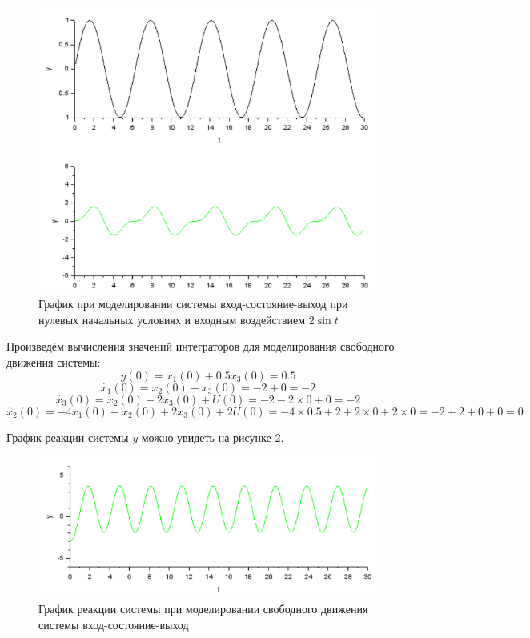 \documentclass[a4paper, 12pt]{article}
\begin{document}
\begin{figure}[h!]
	\centering
	\includegraphics[scale=0.7]{plot2_2}
	\caption{График при моделировании системы вход-состояние-выход при нулевых начальных условиях и входным воздействием $2\sin{t}$}
	\label{p:ГрафикВСВ2}
\end{figure}

Произведём вычисления значений интеграторов для моделирования свободного движения системы:
$$ y(0) = x_1(0) + 0.5x_3(0) = 0.5 $$
$$ \dot{x_1}(0) = x_2(0) + x_3(0) = -2 + 0 = -2 $$
$$ \dot{x_3}(0) = x_2(0) - 2x_3(0) + U(0) = -2 - 2 \times 0 + 0 = -2 $$
$$ \dot{x_2}(0) = -4x_1(0) - x_2(0) + 2x_3(0) + 2U(0) = -4 \times 0.5 + 2 + 2 \times 0 + 2 \times 0 = -2 + 2 + 0 + 0 = 0 $$

График реакции системы $y$ можно увидеть на рисунке \ref{p:ГрафикВСВсвобода}.

\begin{figure}[h!]
	\centering
	\includegraphics[scale=0.7]{plot2_3}
	\caption{График реакции системы при моделировании свободного движения системы вход-состояние-выход}
	\label{p:ГрафикВСВсвобода}
\end{figure}
\end{document}
